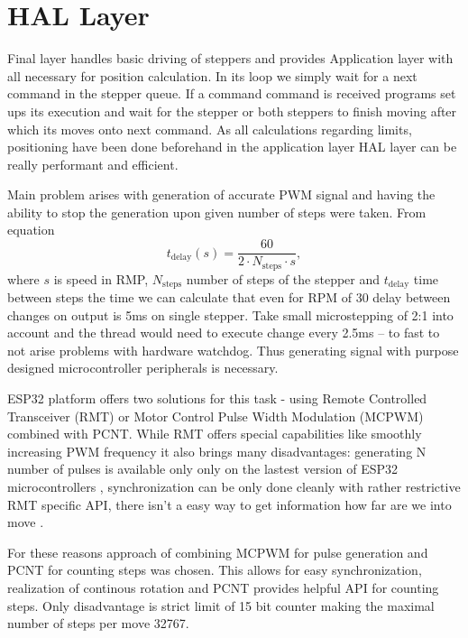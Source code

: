 \section{HAL Layer}

Final layer handles basic driving of steppers and provides Application layer with all necessary for position calculation.
In its loop we simply wait for a next command in the stepper queue.
If a command command is received programs set ups its execution and wait for the stepper or both steppers to finish moving after which its moves onto next command.
As all calculations regarding limits, positioning have been done beforehand in the application layer HAL layer can be really performant and efficient.

Main problem arises with generation of accurate PWM signal and having the ability to stop the generation upon given number of steps were taken.
From equation
%
\begin{equation}
  t_{\mathrm{delay}}(s) = \frac{60}{2\cdot N_{\mathrm{steps}} \cdot s},
  \label{eq:delay}
\end{equation}
%
where  $s$ is speed in RMP, $N_{\mathrm{steps}}$ number of steps of the stepper and  $t_{\mathrm{delay}}$ time between steps the time we can calculate that even for RPM of 30 delay between changes on output is 5ms on single stepper.
Take small microstepping of 2:1 into account and the thread would need to execute change every 2.5ms -- to fast to not arise problems with hardware watchdog.
Thus generating signal with purpose designed microcontroller peripherals is necessary.


ESP32 platform offers two solutions for this task - using Remote Controlled Transceiver (RMT) or Motor Control Pulse Width Modulation (MCPWM) combined with PCNT.
While RMT offers special capabilities like smoothly increasing PWM frequency it also brings many disadvantages: generating N number of pulses is available only only on the lastest version of ESP32 microcontrollers \cite{gitRMT}, synchronization can be only done cleanly with rather restrictive RMT specific API, there isn't a easy way to get information how far are we into move \cite{espRMT}.

For these reasons approach of combining MCPWM for pulse generation and PCNT for counting steps was chosen.
This allows for easy synchronization, realization of continous rotation and PCNT provides helpful API for counting steps\cite{espPCNT}.
Only disadvantage is strict limit of 15 bit counter making the maximal number of steps per move 32767.


